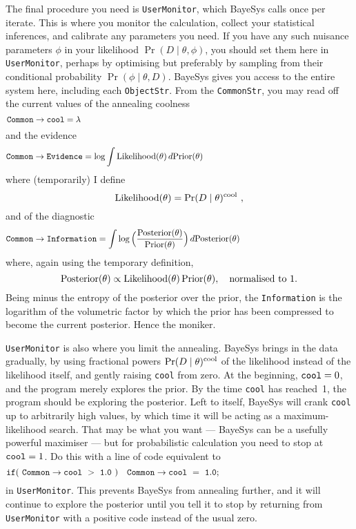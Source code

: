 The final procedure you need is {\tt UserMonitor}, which BayeSys calls once per iterate.  
This is where you monitor the calculation, collect your statistical inferences, and calibrate any parameters you need. 
If you have any such nuisance parameters $\phi$ in your likelihood $\Pr(D\mid \theta,\phi)$, you should set them here in {\tt UserMonitor}, 
perhaps by optimising but preferably by sampling from their conditional probability $\Pr(\phi\mid \theta,D)$. 
BayeSys gives you access to the entire system here, including each {\tt ObjectStr}.  
From the {\tt CommonStr}, you may read off the current values of the annealing coolness
$$
    {\tt Common}\rightarrow{\tt cool} = \lambda \qquad\qquad\qquad\qquad\qquad\qquad\qquad\qquad\qquad\qquad\qquad\qquad\qquad\qquad\qquad\qquad
$$
and the evidence
$$
    {\tt Common}\rightarrow{\tt Evidence} = \log \int {\rm Likelihood}(\theta)\, d{\rm Prior}(\theta)\ \qquad\qquad\qquad\qquad\qquad\qquad\qquad\qquad\quad
$$
where (temporarily) I define
$$
    {\rm Likelihood}(\theta) = \Pr(D\mid \theta)^{\rm cool}\ ,
$$
and of the diagnostic
$$
    {\tt Common}\rightarrow{\tt Information}
       = \int \log\Big({{\rm Posterior}(\theta)\over{\rm Prior}(\theta)}\Big) \,d{\rm Posterior}(\theta)\qquad\qquad\qquad\qquad\qquad\qquad\quad
$$
where, again using the temporary definition,
$$
    {\rm Posterior}(\theta) \propto {\rm Likelihood}(\theta)\, {\rm Prior}(\theta),\quad \hbox{normalised to 1.}
$$
Being minus the entropy of the posterior over the prior, 
the {\tt Information} is the logarithm of the volumetric factor by which the prior has been compressed to become the current posterior.  
Hence the moniker.

{\tt UserMonitor} is also where you limit the annealing.  
BayeSys brings in the data gradually, by using fractional powers $\Pr(D\mid \theta)^{\rm cool}$ of the likelihood instead of the likelihood itself, 
and gently raising {\tt cool} from zero.  
At the beginning, ${\tt cool} = 0$, and the program merely explores the prior.  
By the time {\tt cool} has reached~1, the program should be exploring the posterior.  
Left to itself, BayeSys will crank {\tt cool} up to arbitrarily high values, by which time it will be acting as a maximum-likelihood search.  
That may be what you want --- BayeSys can be a usefully powerful maximiser --- but for probabilistic calculation you need to stop at ${\tt cool} = 1$.  
Do this with a line of code equivalent to
$$
    {\tt if(\ Common}\rightarrow{\tt cool\ >\ 1.0\ )\ \ \ Common}\rightarrow{\tt cool\ =\ 1.0;} \qquad\qquad\qquad\qquad\qquad\qquad\qquad\quad
$$
in {\tt UserMonitor}.  
This prevents BayeSys from annealing further, 
and it will continue to explore the posterior until you tell it to stop by returning from {\tt UserMonitor} with a positive code instead of the usual zero.

